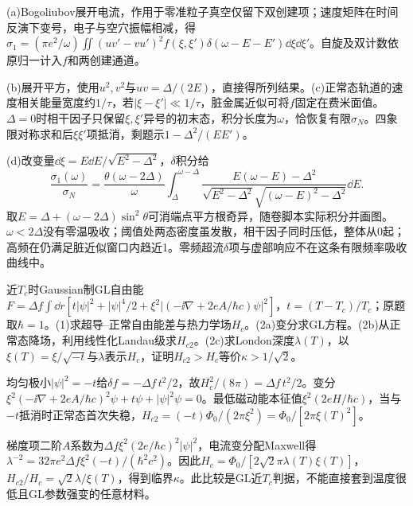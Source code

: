 \begin{solution}
(a)Bogoliubov展开电流，作用于零准粒子真空仅留下双创建项；速度矩阵在时间反演下变号，电子与空穴振幅相减，得$\sigma_1=(\pi e^2/\omega)\iint(uv'-vu')^2f(\xi,\xi')\delta(\omega-E-E')\dd\xi\dd\xi'$。自旋及双计数依原归一计入$f$和两创建通道。

(b)展开平方，使用$u^2,v^2$与$uv=\Delta/(2E)$，直接得所列结果。(c)正常态轨道的速度相关能量宽度约$1/\tau$，若$|\xi-\xi'|\ll1/\tau$，脏金属近似可将$f$固定在费米面值。$\Delta=0$时相干因子只保留$\xi,\xi'$异号的初末态，积分长度为$\omega$，恰恢复有限$\sigma_N$。四象限对称求和后$\xi\xi'$项抵消，剩题示$1-\Delta^2/(EE')$。

(d)改变量$\dd\xi=E\dd E/\sqrt{E^2-\Delta^2}$，$\delta$积分给
\begin{equation}
\frac{\sigma_1(\omega)}{\sigma_N}=\frac{\theta(\omega-2\Delta)}{\omega}\int_\Delta^{\omega-\Delta}\frac{E(\omega-E)-\Delta^2}{\sqrt{E^2-\Delta^2}\sqrt{(\omega-E)^2-\Delta^2}}\dd E.
\end{equation}
取$E=\Delta+(\omega-2\Delta)\sin^2\theta$可消端点平方根奇异，随卷脚本实际积分并画图。$\omega<2\Delta$没有零温吸收；阈值处两态密度虽发散，相干因子同时压低，整体从0起；高频在仍满足脏近似窗口内趋近1。零频超流$\delta$项与虚部响应不在这条有限频率吸收曲线中。
\end{solution}

\begin{exercise}[原题1、2(a)--(c)]\label{p:512-8-1}
近$T_c$时Gaussian制GL自由能$F=\Delta f\int\dd r[t|\psi|^2+|\psi|^4/2+\xi^2|(-\ii\nabla+2eA/\hbar c)\psi|^2]$，$t=(T-T_c)/T_c$；原题取$\hbar=1$。(1)求超导--正常自由能差与热力学场$H_c$。(2a)变分求GL方程。(2b)从正常态降场，利用线性化Landau级求$H_{c2}$。(2c)求London深度$\lambda(T)$，以$\xi(T)=\xi/\sqrt{-t}$与$\lambda$表示$H_c$，证明$H_{c2}>H_c$等价$\kappa>1/\sqrt2$。
\end{exercise}
\begin{solution}
均匀极小$|\psi|^2=-t$给$\delta f=-\Delta f\,t^2/2$，故$H_c^2/(8\pi)=\Delta f\,t^2/2$。变分$\xi^2(-\ii\nabla+2eA/\hbar c)^2\psi+t\psi+|\psi|^2\psi=0$。最低磁动能本征值$\xi^2(2eH/\hbar c)$，当与$-t$抵消时正常态首次失稳，$H_{c2}=(-t)\Phi_0/(2\pi\xi^2)=\Phi_0/[2\pi\xi(T)^2]$。

梯度项二阶$A$系数为$\Delta f\xi^2(2e/\hbar c)^2|\psi|^2$，电流变分配Maxwell得$\lambda^{-2}=32\pi e^2\Delta f\xi^2(-t)/(\hbar^2c^2)$。因此$H_c=\Phi_0/[2\sqrt2\pi\lambda(T)\xi(T)]$，$H_{c2}/H_c=\sqrt2\lambda/\xi(T)$，得到临界$\kappa$。此比较是GL近$T_c$判据，不能直接套到温度很低且GL参数强变的任意材料。
\end{solution}
